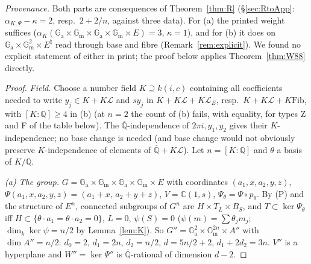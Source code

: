 \documentclass[11pt]{amsart}
\theoremstyle{definition}
\newcommand{\Qb}{\overline{\mathbb{Q}}}
\newcommand{\C}{\mathbb{C}}
\newcommand{\Q}{\mathbb{Q}}
\newcommand{\Ga}{\mathbb{G}_{\mathrm a}}
\newcommand{\Gm}{\mathbb{G}_{\mathrm m}}
\newcommand{\Lg}{\mathcal{L}}
\newcommand{\Fib}{\mathrm{Fib}}
\begin{document}
\noindent\emph{Provenance.} Both parts are consequences of Theorem~\ref{thm:R} (\S\ref{sec:RtoApp}:
$\alpha_{K,\Psi}-\kappa=2$, resp.\ $2+2/n$, against three data). For (a) the printed weight suffices
($\alpha_K(\Ga\times\Gm\times\Ga\times\Gm\times E)=3$, $\kappa=1$), and for (b) it does on $\Ga\times\Gm^2\times E^\natural$
read through base and fibre (Remark~\ref{rem:explicit}). We found no explicit statement of either in print; the proof below
applies Theorem~\ref{thm:W88} directly.

\begin{proof}
\emph{Field.} Choose a number field $K\supseteq k(i,c)$ containing all coefficients needed to write $y_j\in K+K\Lg$ and
$sy_j$ in $K+K\Lg+K\Lg_E$, resp.\ $K+K\Lg+K\Fib$, with $[K:\Q]\ge4$ in (b) (at $n=2$ the count of (b) fails, with equality,
for types Z and F of the table below). The $\Qb$-independence of $2\pi i,y_1,y_2$
gives their $K$-independence; no base change is needed (and base change would not obviously preserve $K$-independence
of elements of $\Qb+K\Lg$). Let $n=[K:\Q]$ and $\theta$ a basis of $K/\Q$.

\emph{(a) The group.} $G=\Ga\times\Gm\times\Ga\times\Gm\times E$ with coordinates $(a_1,x,a_2,y,z)$,
$\Psi(a_1,x,a_2,y,z)=(a_1+x,\,a_2+y+z)$, $V=\C(1,s)$, $\Psi_\theta=\Psi\circ p_\theta$. By (P) and the structure of $E^n$,
connected subgroups of $G^n$ are $H\times T_L\times B_S$, and $T\subset\ker\Psi_\theta$ iff
$H\subset\{\theta\cdot a_1=\theta\cdot a_2=0\}$, $L=0$, $\psi(S)=0$ ($\psi(m)=\sum\theta_jm_j$; $\dim_k\ker\psi=n/2$ by
Lemma~\ref{lem:K}). So $G''=\Ga^2\times\Gm^{2n}\times A''$ with $\dim A''=n/2$: $d_0=2$, $d_1=2n$, $d_2=n/2$,
$d=5n/2+2$, $d_1+2d_2=3n$. $V''$ is a hyperplane and $W''=\ker\Psi''$ is $\Qb$-rational of dimension $d-2$.


\end{proof}
\end{document}
